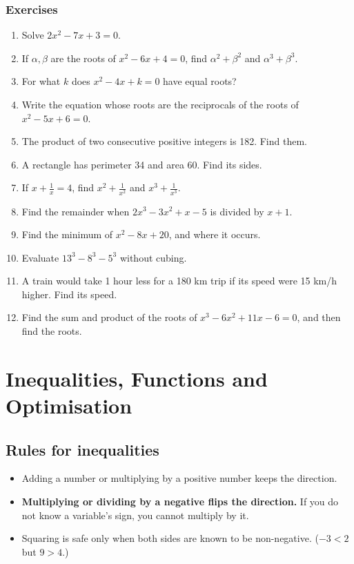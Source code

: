 \documentclass[11pt,a4paper,openany]{report}
\newenvironment{exercises}{\subsection*{Exercises \thechapter}\begin{enumerate}[label=\textbf{\thechapter.\arabic*},leftmargin=3.2em]}{\end{enumerate}}
\begin{document}
\begin{exercises}
\item Solve $2x^2-7x+3=0$.
\item If $\alpha,\beta$ are the roots of $x^2-6x+4=0$, find $\alpha^2+\beta^2$ and $\alpha^3+\beta^3$.
\item For what $k$ does $x^2-4x+k=0$ have equal roots?
\item Write the equation whose roots are the reciprocals of the roots of $x^2-5x+6=0$.
\item The product of two consecutive positive integers is 182. Find them.
\item A rectangle has perimeter 34 and area 60. Find its sides.
\item If $x+\frac1x=4$, find $x^2+\frac1{x^2}$ and $x^3+\frac1{x^3}$.
\item Find the remainder when $2x^3-3x^2+x-5$ is divided by $x+1$.
\item Find the minimum of $x^2-8x+20$, and where it occurs.
\item Evaluate $13^3-8^3-5^3$ without cubing.
\item A train would take 1 hour less for a 180 km trip if its speed were 15 km/h higher. Find its speed.
\item Find the sum and product of the roots of $x^3-6x^2+11x-6=0$, and then find the roots.
\end{exercises}

\chapter{Inequalities, Functions and Optimisation}\label{ch:ineq}

\section{Rules for inequalities}
\begin{itemize}[nosep]
\item Adding a number or multiplying by a positive number keeps the direction.
\item \textbf{Multiplying or dividing by a negative flips the direction.} If you do not know a variable's sign, you cannot multiply by it.
\item Squaring is safe only when both sides are known to be non-negative. ($-3<2$ but $9>4$.)
\end{itemize}
\end{document}

